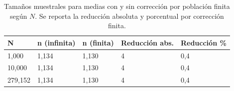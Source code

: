\begin{table}

\caption{Tamaños muestrales para medias con y sin corrección por población finita según \(N\). Se reporta la reducción absoluta y porcentual por corrección finita.}
\centering
\begin{tabular}[t]{lllll}
\toprule
N & n (infinita) & n (finita) & Reducción abs. & Reducción \%\\
\midrule
1,000 & 1,134 & 1,130 & 4 & 0,4\\
10,000 & 1,134 & 1,130 & 4 & 0,4\\
279,152 & 1,134 & 1,130 & 4 & 0,4\\
\bottomrule
\end{tabular}
\end{table}
